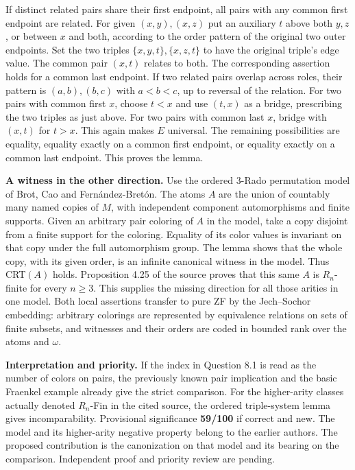 \documentclass[11pt]{article}
\begin{document}
If distinct related pairs share their first endpoint, all pairs with any common first endpoint are related. For given \((x,y),(x,z)\) put an auxiliary \(t\) above both \(y,z\), or between \(x\) and both, according to the order pattern of the original two outer endpoints. Set the two triples \(\{x,y,t\},\{x,z,t\}\) to have the original triple's edge value. The common pair \((x,t)\) relates to both. The corresponding assertion holds for a common last endpoint. If two related pairs overlap across roles, their pattern is \((a,b),(b,c)\) with \(a<b<c\), up to reversal of the relation. For two pairs with common first \(x\), choose \(t<x\) and use \((t,x)\) as a bridge, prescribing the two triples as just above. For two pairs with common last \(x\), bridge with \((x,t)\) for \(t>x\). This again makes \(E\) universal. The remaining possibilities are equality, equality exactly on a common first endpoint, or equality exactly on a common last endpoint. This proves the lemma.

\textbf{A witness in the other direction.} Use the ordered \(3\)-Rado permutation model of Brot, Cao and Fernández-Bretón. The atoms \(A\) are the union of countably many named copies of \(M\), with independent component automorphisms and finite supports. Given an arbitrary pair coloring of \(A\) in the model, take a copy disjoint from a finite support for the coloring. Equality of its color values is invariant on that copy under the full automorphism group. The lemma shows that the whole copy, with its given order, is an infinite canonical witness in the model. Thus CRT\((A)\) holds. Proposition 4.25 of the source proves that this same \(A\) is \(R_n\)-finite for every \(n\ge3\). This supplies the missing direction for all those arities in one model. Both local assertions transfer to pure ZF by the Jech--Sochor embedding: arbitrary colorings are represented by equivalence relations on sets of finite subsets, and witnesses and their orders are coded in bounded rank over the atoms and \(\omega\).

\textbf{Interpretation and priority.} If the index in Question 8.1 is read as the number of colors on pairs, the previously known pair implication and the basic Fraenkel example already give the strict comparison. For the higher-arity classes actually denoted \(R_n\)-Fin in the cited source, the ordered triple-system lemma gives incomparability. Provisional significance \textbf{59/100} if correct and new. The model and its higher-arity negative property belong to the earlier authors. The proposed contribution is the canonization on that model and its bearing on the comparison. Independent proof and priority review are pending.
\end{document}
